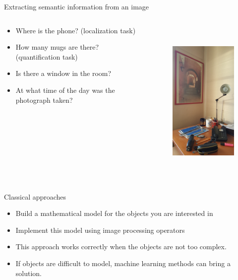 \documentclass[xcolor=pdftex,dvipsnames,table,mathserif]{beamer}
\begin{document}
\begin{frame}{Extracting semantic information from an image}

\begin{columns}
  \begin{column}{.5\textwidth}
\begin{itemize}
\item Where is the phone? (localization task)
\item How many mugs are there? (quantification task)
\item Is there a window in the room?
\item At what time of the day was the photograph taken?
\end{itemize}
  \end{column}

  \begin{column}{.5\textwidth}
    \begin{figure}[ht]
      \centering
      \includegraphics[height=8cm]{bureau-1}
    \end{figure}

  \end{column}
\end{columns}

\end{frame}


\begin{frame}{Classical approaches}

\begin{itemize}
\item Build a mathematical model for the objects you are interested in
\item Implement this model using image processing operators
\end{itemize}

\begin{itemize}
\item This approach works correctly when the objects are not too complex.
\item If objects are difficult to model, machine learning methods can bring a solution.
\end{itemize}



\end{frame}
\end{document}
